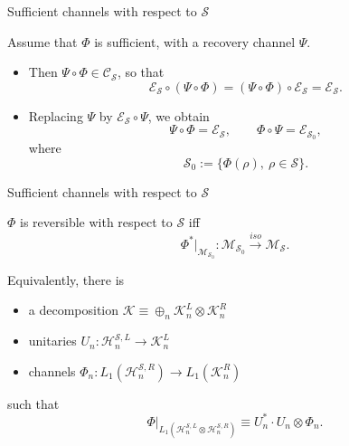 \documentclass[mathserif]{beamer}
\newcommand{\<}{\langle}
\renewcommand{\>}{\rangle}
\newcommand{\Se}{\mathcal S}
\newcommand{\Ee}{\mathcal E}
\newcommand{\Me}{\mathcal M}
\newcommand{\Ce}{\mathcal C}
\newcommand{\Ha}{\mathcal H}
\newcommand{\Ka}{\mathcal K}
\begin{document}
\begin{frame}{Sufficient channels with respect to $\Se$}

Assume that $\Phi$ is sufficient, with a recovery channel $\Psi$.
\medskip

\begin{itemize}
\item Then $\Psi\circ\Phi\in \Ce_\Se$, so that 
\[
\Ee_\Se\circ
(\Psi\circ\Phi)=(\Psi\circ\Phi)\circ\Ee_\Se=\Ee_\Se.
\]
\item  Replacing  $\Psi$ by $\Ee_\Se\circ\Psi$, we obtain 
\[
 \Psi\circ \Phi=\Ee_\Se, \qquad \Phi\circ\Psi=\Ee_{\Se_0},
\]
where
\[
\Se_0:=\{\Phi(\rho),\ \rho\in \Se\}.
\]



\end{itemize}

\end{frame}



\begin{frame}{Sufficient channels with respect to $\Se$}


 $\Phi$ is reversible with respect to $\Se$ iff 
\[
\Phi^*|_{\Me_{\Se_0}}: \Me_{\Se_0} \xrightarrow{iso}\Me_\Se.
\]


Equivalently, there is 
\medskip

\begin{itemize}
\item a decomposition $\Ka\equiv \oplus_n \Ka_n^L\otimes \Ka_n^R$


\item  unitaries $U_n: \Ha_n^{\Se,L}\to \Ka_n^L$

\item channels  $\Phi_n:L_1(\Ha^{\Se,R}_n)\to L_1(\Ka_n^R)$ 

\end{itemize}
\medskip

such that 
\[
\Phi|_{L_1(\Ha_n^{\Se,L}\otimes \Ha_n^{\Se,R})}\equiv U_n^* \cdot U_n\otimes \Phi_n.
\]



\end{frame}
\end{document}
